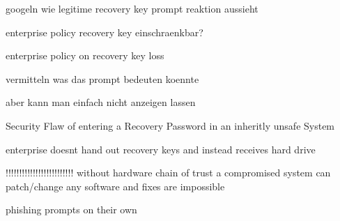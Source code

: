 googeln wie legitime recovery key prompt reaktion aussieht

enterprise policy recovery key einschraenkbar?

enterprise policy on recovery key loss

vermitteln was das prompt bedeuten koennte

aber kann man einfach nicht anzeigen lassen

Security Flaw of entering a Recovery Password in an inheritly unsafe System

enterprise doesnt hand out recovery keys and instead receives hard drive


!!!!!!!!!!!!!!!!!!!!!!!!!
without hardware chain of trust a compromised system can patch/change any software and fixes are impossible

phishing prompts on their own
